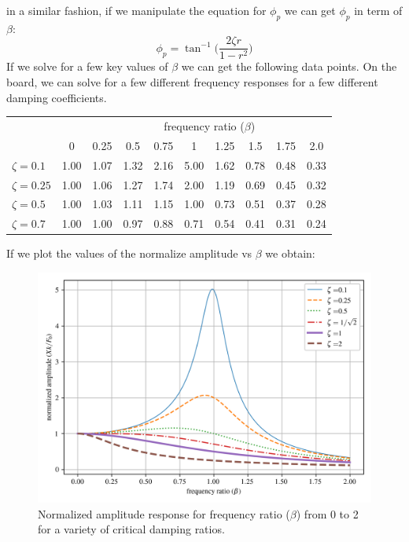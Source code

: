\documentclass[12pt,letter]{article}
\numberwithin{ex}{section} %
\numberwithin{re}{section} %
\begin{document}
			in a similar fashion, if we manipulate the equation for $\phi_p$ we can get $\phi_p$ in term of $\beta$:
			\begin{equation}
				\phi_p = \tan^{-1} \bigg(\frac{2 \zeta r}{1-r^2}\bigg)
			\end{equation}	
			If we solve for a few key values of $\beta$ we can get the following data points. On the board, we can solve for a few different frequency responses for a few different damping coefficients. 
			\begin{table}[H]
				\centering
				\begin{tabular}{@{}lccccccccc@{}}
				\toprule
				 & & \multicolumn{8}{c}{frequency ratio ($\beta$)} \\ 
				 & 0 & 0.25& 0.5& 0.75& 1& 1.25& 1.5& 1.75& 2.0 \\ \midrule
				$\zeta=0.1$	&	1.00&	1.07&	1.32&	2.16&	5.00&	1.62&	0.78&	0.48 & 0.33 \\ 
				$\zeta=0.25$	&	1.00&	1.06&	1.27&	1.74&	2.00&	1.19&	0.69&	0.45 & 0.32 \\ 
				$\zeta=0.5$	&	1.00&	1.03&	1.11&	1.15&	1.00&	0.73&	0.51&	0.37 & 0.28\\ 
				$\zeta=0.7$	&	1.00&  1.00	&   0.97&	0.88&	0.71&	0.54&	0.41&	0.31 & 0.24\\\bottomrule
				\end{tabular}
			\end{table}
			If we plot the values of the normalize amplitude vs $\beta$ we obtain:
			\begin{figure}[H]
				\centering
				\includegraphics[]{../Figures/underdamped_frequency_response_amplitude.png}
				\caption{Normalized amplitude response for frequency ratio ($\beta$) from 0 to 2 for a variety of critical damping ratios.}
			\end{figure}			
\end{document}
